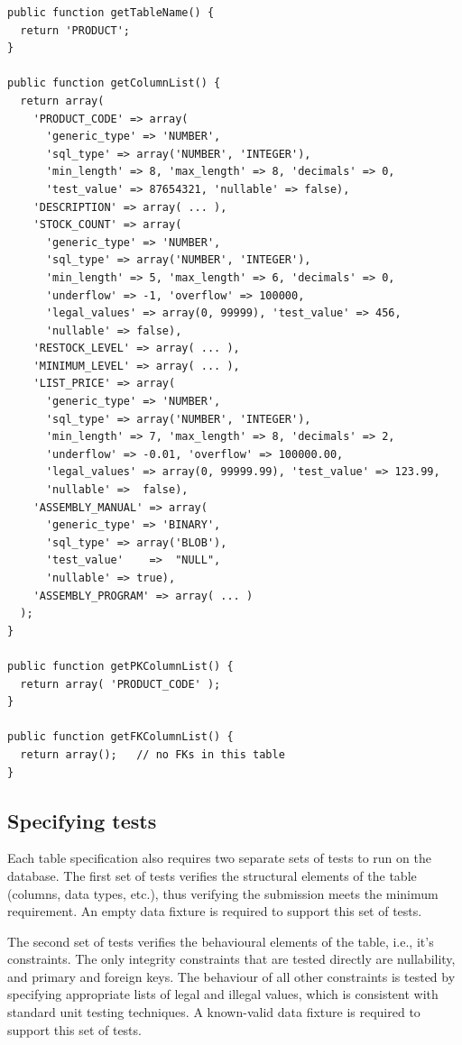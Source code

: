 \documentclass[sigconf, authordraft, capitalise]{acmart}
\begin{document}
\begin{table}
    \footnotesize
    \begin{verbatim}
public function getTableName() {
  return 'PRODUCT';
}

public function getColumnList() {
  return array(
    'PRODUCT_CODE' => array(
      'generic_type' => 'NUMBER',
      'sql_type' => array('NUMBER', 'INTEGER'),
      'min_length' => 8, 'max_length' => 8, 'decimals' => 0,
      'test_value' => 87654321, 'nullable' => false),
    'DESCRIPTION' => array( ... ),
    'STOCK_COUNT' => array(
      'generic_type' => 'NUMBER',
      'sql_type' => array('NUMBER', 'INTEGER'),
      'min_length' => 5, 'max_length' => 6, 'decimals' => 0,
      'underflow' => -1, 'overflow' => 100000,
      'legal_values' => array(0, 99999), 'test_value' => 456,
      'nullable' => false),
    'RESTOCK_LEVEL' => array( ... ),
    'MINIMUM_LEVEL' => array( ... ),
    'LIST_PRICE' => array(
      'generic_type' => 'NUMBER',
      'sql_type' => array('NUMBER', 'INTEGER'),
      'min_length' => 7, 'max_length' => 8, 'decimals' => 2,
      'underflow' => -0.01, 'overflow' => 100000.00,
      'legal_values' => array(0, 99999.99), 'test_value' => 123.99,
      'nullable' =>  false),
    'ASSEMBLY_MANUAL' => array(
      'generic_type' => 'BINARY',
      'sql_type' => array('BLOB'),
      'test_value'    =>  "NULL",
      'nullable' => true),
    'ASSEMBLY_PROGRAM' => array( ... )
  );
}

public function getPKColumnList() {
  return array( 'PRODUCT_CODE' );
}

public function getFKColumnList() {
  return array();   // no FKs in this table
}   \end{verbatim}
    \caption{Fragment of the \textsf{Product} table specification.}
    \label{fig-test-class}
\end{table}


\subsection{Specifying tests}

Each table specification also requires two separate sets of tests to run on the database. The first set of tests verifies the structural elements of the table (columns, data types, etc.), thus verifying the submission meets the minimum requirement. An empty data fixture is required to support this set of tests.

The second set of tests verifies the behavioural elements of the table, i.e., it's constraints. The only integrity constraints that are tested directly are nullability, and primary and foreign keys. The behaviour of all other constraints is tested by specifying appropriate lists of legal and illegal values, which is consistent with standard unit testing techniques. A known-valid data fixture is required to support this set of tests.
\end{document}
